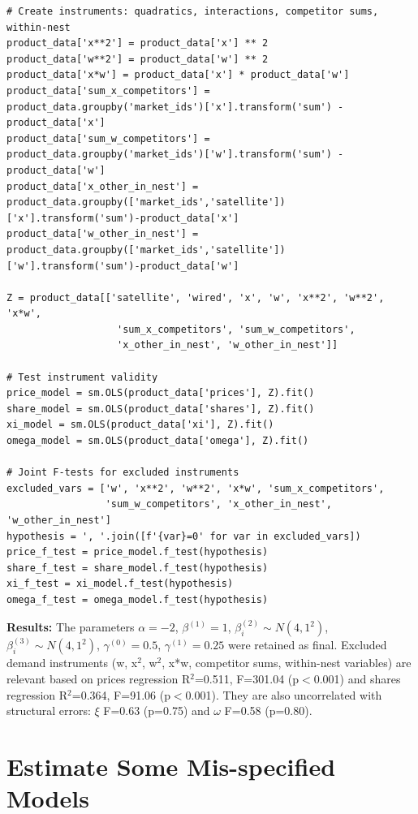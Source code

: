 \documentclass[english,11pt]{article}
\begin{document}
\begin{verbatim}
# Create instruments: quadratics, interactions, competitor sums, within-nest
product_data['x**2'] = product_data['x'] ** 2
product_data['w**2'] = product_data['w'] ** 2
product_data['x*w'] = product_data['x'] * product_data['w']
product_data['sum_x_competitors'] = 
product_data.groupby('market_ids')['x'].transform('sum') - product_data['x']
product_data['sum_w_competitors'] = 
product_data.groupby('market_ids')['w'].transform('sum') - product_data['w']
product_data['x_other_in_nest'] = 
product_data.groupby(['market_ids','satellite'])['x'].transform('sum')-product_data['x']
product_data['w_other_in_nest'] = 
product_data.groupby(['market_ids','satellite'])['w'].transform('sum')-product_data['w']

Z = product_data[['satellite', 'wired', 'x', 'w', 'x**2', 'w**2', 'x*w', 
                   'sum_x_competitors', 'sum_w_competitors', 
                   'x_other_in_nest', 'w_other_in_nest']]

# Test instrument validity
price_model = sm.OLS(product_data['prices'], Z).fit()
share_model = sm.OLS(product_data['shares'], Z).fit()
xi_model = sm.OLS(product_data['xi'], Z).fit()
omega_model = sm.OLS(product_data['omega'], Z).fit()

# Joint F-tests for excluded instruments
excluded_vars = ['w', 'x**2', 'w**2', 'x*w', 'sum_x_competitors', 
                 'sum_w_competitors', 'x_other_in_nest', 'w_other_in_nest']
hypothesis = ', '.join([f'{var}=0' for var in excluded_vars])
price_f_test = price_model.f_test(hypothesis)
share_f_test = share_model.f_test(hypothesis)
xi_f_test = xi_model.f_test(hypothesis)
omega_f_test = omega_model.f_test(hypothesis)
\end{verbatim}


\textbf{Results:} The parameters $\alpha = -2$, $\beta^{(1)} = 1$, $\beta_i^{(2)} \sim N(4, 1^2)$, $\beta_i^{(3)} \sim N(4, 1^2)$, $\gamma^{(0)} = 0.5$, $\gamma^{(1)} = 0.25$ were retained as final. Excluded demand instruments (w, x$^2$, w$^2$, x*w, competitor sums, within-nest variables) are relevant based on prices regression R$^2$=0.511, F=301.04 (p$<$0.001) and shares regression R$^2$=0.364, F=91.06 (p$<$0.001). They are also uncorrelated with structural errors: $\xi$ F=0.63 (p=0.75) and $\omega$ F=0.58 (p=0.80).


\section{Estimate Some Mis-specified Models}
\end{document}
